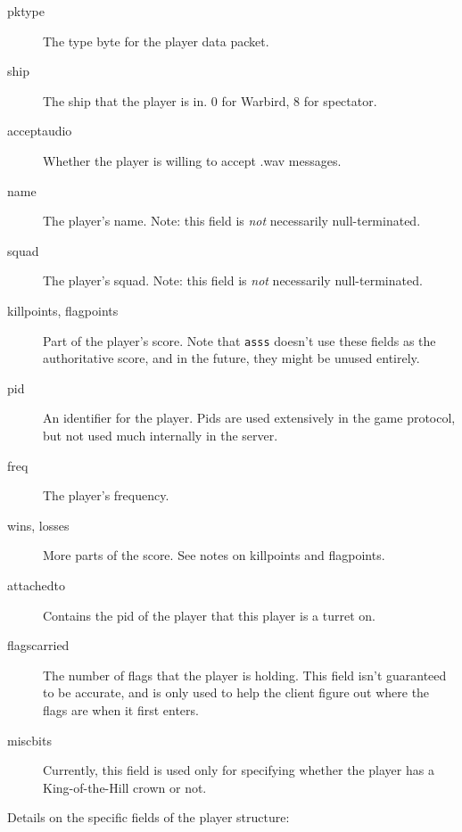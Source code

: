 \documentclass{article}
\newcommand{\asss}{\texttt{asss}}
\begin{document}
\begin{description}

\item[pktype] The type byte for the player data packet.

\item[ship] The ship that the player is in. 0 for Warbird, 8 for
spectator.

\item[acceptaudio] Whether the player is willing to accept .wav
messages.

\item[name] The player's name. Note: this field is \emph{not}
necessarily null-terminated.

\item[squad] The player's squad. Note: this field is \emph{not}
necessarily null-terminated.

\item[killpoints, flagpoints] Part of the player's score. Note that
\asss{} doesn't use these fields as the authoritative score, and in the
future, they might be unused entirely.

\item[pid] An identifier for the player. Pids are used extensively in
the game protocol, but not used much internally in the server.

\item[freq] The player's frequency.

\item[wins, losses] More parts of the score. See notes on killpoints and
flagpoints.

\item[attachedto] Contains the pid of the player that this player is a
turret on.

\item[flagscarried] The number of flags that the player is holding. This
field isn't guaranteed to be accurate, and is only used to help the
client figure out where the flags are when it first enters.

\item[miscbits] Currently, this field is used only for specifying
whether the player has a King-of-the-Hill crown or not.

\end{description}

Details on the specific fields of the player structure:
\end{document}
